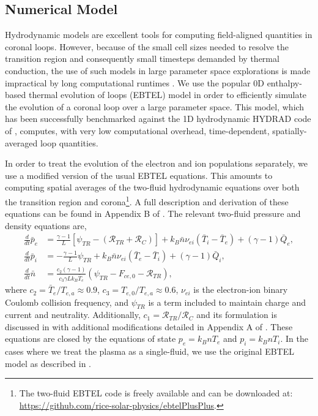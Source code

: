 \documentclass[preprint]{aastex}
\begin{document}
	\subsection{Numerical Model}
	\label{subsec:numerics}
	\par Hydrodynamic models are excellent tools for computing field-aligned quantities in coronal loops. However, because of the small cell sizes needed to resolve the transition region and consequently small timesteps demanded by thermal conduction, the use of such models in large parameter space explorations is made impractical by long computational runtimes \citep{bradshaw_influence_2013}. We use the popular 0D enthalpy-based thermal evolution of loops (EBTEL) model \citep{klimchuk_highly_2008,cargill_enthalpy-based_2012,cargill_enthalpy-based_2012-1,cargill_modelling_2015} in order to efficiently simulate the evolution of a coronal loop over a large parameter space. This model, which has been successfully benchmarked against the 1D hydrodynamic HYDRAD code of \citet{bradshaw_influence_2013}, computes, with very low computational overhead, time-dependent, spatially-averaged loop quantities.
	\par In order to treat the evolution of the electron and ion populations separately, we use a modified version of the usual EBTEL equations. This amounts to computing spatial averages of the two-fluid hydrodynamic equations over both the transition region and corona\footnote{The two-fluid EBTEL  code is freely available and can be downloaded at: \url{https://github.com/rice-solar-physics/ebtelPlusPlus}.}. A full description and derivation of these equations can be found in Appendix B of . The relevant two-fluid pressure and density equations are,
	\begin{align}
		\frac{d}{dt}\bar{p}_e &= \frac{\gamma - 1}{L}\left\lbrack\psi_{TR} - (\mathcal{R}_{TR} + \mathcal{R}_C)\right\rbrack + k_B\bar{n}\nu_{ei}(\bar{T}_i - \bar{T}_e) + (\gamma - 1)\bar{Q}_e,\label{eq:ebtel2fl_pe}\\
		\frac{d}{dt}\bar{p}_i &= -\frac{\gamma - 1}{L}\psi_{TR} + k_B\bar{n}\nu_{ei}(\bar{T}_e - \bar{T}_i) + (\gamma - 1)\bar{Q}_i,\label{eq:ebtel2fl_pi}\\
		\frac{d}{dt}\bar{n} &= \frac{c_2(\gamma - 1)}{c_3\gamma Lk_B\bar{T}_e}\left(\psi_{TR} - F_{ce,0} - \mathcal{R}_{TR}\right),\label{eq:ebtel2fl_n}
	\end{align}
	where $c_2=\bar{T}_e/T_{e,a}\approx0.9$, $c_3=T_{e,0}/T_{e,a}\approx0.6$, $\nu_{ei}$ is the electron-ion binary Coulomb collision frequency, and $\psi_{TR}$ is a term included to maintain charge and current and neutrality. Additionally, $c_1=\mathcal{R}_{TR}/\mathcal{R}_C$ and its formulation is discussed in \citet{cargill_enthalpy-based_2012} with additional modifications detailed in Appendix A of . These equations are closed by the equations of state $p_e=k_BnT_e$ and $p_i=k_BnT_i$. In the cases where we treat the plasma as a single-fluid, we use the original EBTEL model as described in \citet{klimchuk_highly_2008,cargill_enthalpy-based_2012}.
\end{document}
